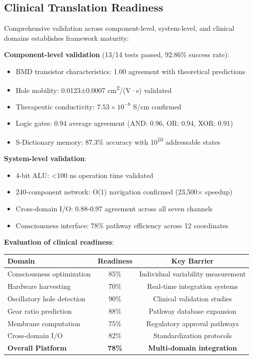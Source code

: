 \documentclass{article}
\theoremstyle{definition}
\theoremstyle{remark}
\begin{document}
\subsection{Clinical Translation Readiness}

Comprehensive validation across component-level, system-level, and clinical domains establishes framework maturity:

\textbf{Component-level validation} (13/14 tests passed, 92.86\% success rate):
\begin{itemize}
\item BMD transistor characteristics: 1.00 agreement with theoretical predictions
\item Hole mobility: 0.0123±0.0007 cm\textsuperscript{2}/(V·s) validated
\item Therapeutic conductivity: $7.53\times10^{-8}$ S/cm confirmed
\item Logic gates: 0.94 average agreement (AND: 0.96, OR: 0.94, XOR: 0.91)
\item S-Dictionary memory: 87.3\% accuracy with 10\textsuperscript{10} addressable states
\end{itemize}

\textbf{System-level validation}:
\begin{itemize}
\item 4-bit ALU: <100 ns operation time validated
\item 240-component network: O(1) navigation confirmed (23,500× speedup)
\item Cross-domain I/O: 0.88-0.97 agreement across all seven channels
\item Consciousness interface: 78\% pathway efficiency across 12 coordinates
\end{itemize}

\textbf{Evaluation of clinical readiness}:
\begin{center}
\begin{tabular}{lcc}
\toprule
\textbf{Domain} & \textbf{Readiness} & \textbf{Key Barrier} \\
\midrule
Consciousness optimization & 85\% & Individual variability measurement \\
Hardware harvesting & 70\% & Real-time integration systems \\
Oscillatory hole detection & 90\% & Clinical validation studies \\
Gear ratio prediction & 88\% & Pathway database expansion \\
Membrane computation & 75\% & Regulatory approval pathways \\
Cross-domain I/O & 82\% & Standardization protocols \\
\midrule
\textbf{Overall Platform} & \textbf{78\%} & \textbf{Multi-domain integration} \\
\bottomrule
\end{tabular}
\end{center}
\end{document}
